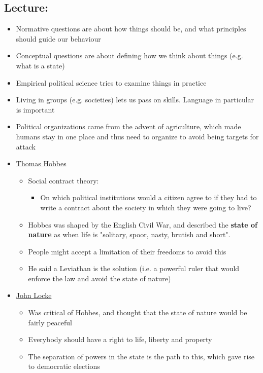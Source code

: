\documentclass[11pt]{article}
\begin{document}
\subsection{Lecture:}
\label{sec:orgb9f3303}
\begin{itemize}
\item Normative questions are about how things should be, and what principles should
guide our behaviour
\item Conceptual questions are about defining how we think about things (e.g. what
is a state)
\item Empirical political science tries to examine things in practice
\item Living in groups (e.g. societies) lets us pass on skills. Language in
particular is important
\item Political organizations came from the advent of agriculture, which made humans
stay in one place and thus need to organize to avoid being targets for attack
\item \href{ThomasHobbes.org}{Thomas Hobbes}
\begin{itemize}
\item Social contract theory:
\begin{itemize}
\item On which political institutions would a citizen agree to if they had to
write a contract about the society in which they were going to live?
\end{itemize}
\item Hobbes was shaped by the English Civil War, and described the \textbf{state of
nature} as when life is "solitary, spoor, nasty, brutish and short".
\item People might accept a limitation of their freedoms to avoid this
\item He said a Leviathan is the solution (i.e. a powerful ruler that would
enforce the law and avoid the state of nature)
\end{itemize}
\item \href{JohnLocke.org}{John Locke}
\begin{itemize}
\item Was critical of Hobbes, and thought that the state of nature would be fairly peaceful
\item Everybody should have a right to life, liberty and property
\item The separation of powers in the state is the path to this, which gave rise
to democratic elections
\end{itemize}
\end{itemize}
\end{document}
